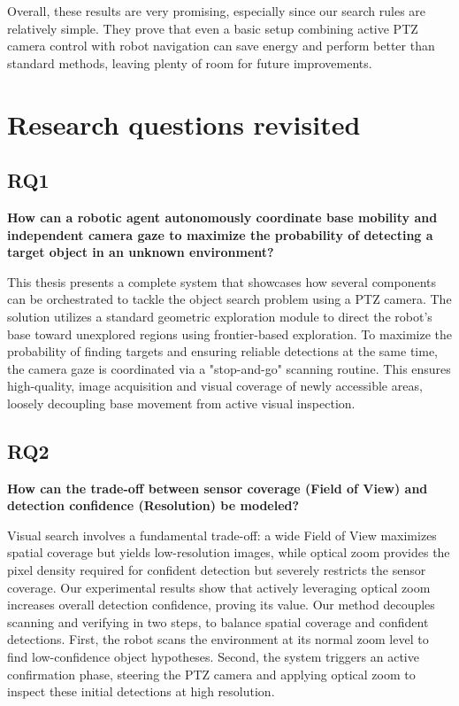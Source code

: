 \documentclass[
	parspace, %
	noindent, %
	final, %
]{elteikthesis}
\begin{document}
Overall, these results are very promising, especially since our search rules are relatively simple. They prove that even a basic setup combining active PTZ camera control with robot navigation can save energy and perform better than standard methods, leaving plenty of room for future improvements.

\section{Research questions revisited}

\subsection{RQ1}
\textbf{How can a robotic agent autonomously coordinate base mobility and independent camera gaze to maximize the probability of detecting a target object in an unknown environment?}

This thesis presents a complete system that showcases how several components can be  orchestrated to tackle the object search problem using a PTZ camera. The solution utilizes a standard geometric exploration module to direct the robot's base toward unexplored regions using frontier-based exploration. To maximize the probability of finding targets and ensuring reliable detections at the same time, the camera gaze is coordinated via a "stop-and-go" scanning routine. This ensures high-quality, image acquisition and visual coverage of newly accessible areas, loosely decoupling base movement from active visual inspection.

\pagebreak
\subsection{RQ2}
\textbf{How can the trade-off between sensor coverage (Field of View) and detection confidence (Resolution) be modeled?}

Visual search involves a fundamental trade-off: a wide Field of View maximizes spatial coverage but yields low-resolution images, while optical zoom provides the pixel density required for confident detection but severely restricts the sensor coverage. Our experimental results show that actively leveraging optical zoom increases overall detection confidence, proving its value. Our method decouples scanning and verifying in two steps, to balance spatial coverage and confident detections. First, the robot scans the environment at its normal zoom level to find low-confidence object hypotheses. Second, the system triggers an active confirmation phase, steering the PTZ camera and applying optical zoom to inspect these initial detections at high resolution.
\end{document}
